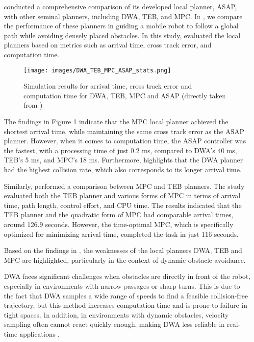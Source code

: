 \documentclass[conference]{IEEEtran}
\begin{document}

\cite{ASAP} conducted a comprehensive comparison of its developed local planner, ASAP, with other seminal planners, including DWA, TEB, and MPC. In \cite{ASAP}, we compare the performance of these planners in guiding a mobile robot to follow a global path while avoiding densely placed obstacles. In this study, \cite{ASAP} evaluated the local planners based on metrics such as arrival time, cross track error, and computation time. 

\begin{figure}[!h]
    \centering
    \texttt{[image: images/DWA\_TEB\_MPC\_ASAP\_stats.png]}
    \caption{Simulation results for arrival time, cross track error and computation time for DWA, TEB, MPC and ASAP (directly taken from \cite{ASAP})}
    \label{fig:DWA_TEB_MPC_ASAP_stats}
\end{figure}

The findings in Figure \ref{fig:DWA_TEB_MPC_ASAP_stats} indicate that the MPC local planner achieved the shortest arrival time, while maintaining the same cross track error as the ASAP planner. However, when it comes to computation time, the ASAP controller was the fastest, with a processing time of just 0.2 ms, compared to DWA's 40 ms, TEB's 5 ms, and MPC's 18 ms. Furthermore, \cite{ASAP} highlights that the DWA planner had the highest collision rate, which also corresponds to its longer arrival time.

Similarly, \cite{MPCvsTEB} performed a comparison between MPC and TEB planners. The study evaluated both the TEB planner and various forms of MPC in terms of arrival time, path length, control effort, and CPU time. The results indicated that the TEB planner and the quadratic form of MPC had comparable arrival times, around 126.9 seconds. However, the time-optimal MPC, which is specifically optimized for minimizing arrival time, completed the task in just 116 seconds.

Based on the findings in \cite{ASAP}, the weaknesses of the local planners DWA, TEB and MPC are highlighted, particularly in the context of dynamic obstacle avoidance.

DWA faces significant challenges when obstacles are directly in front of the robot, especially in environments with narrow passages or sharp turns. This is due to the fact that DWA samples a wide range of speeds to find a feasible collision-free trajectory, but this method increases computation time and is prone to failure in tight spaces. In addition, in environments with dynamic obstacles, velocity sampling often cannot react quickly enough, making DWA less reliable in real-time applications \cite{ASAP}.
\end{document}
